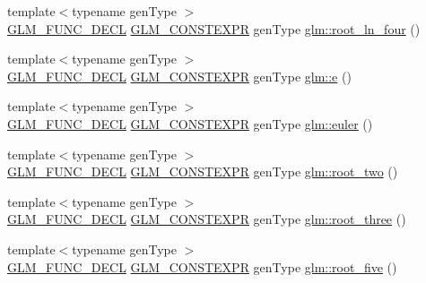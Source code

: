 \begin{DoxyCompactItemize}
\item 
{\footnotesize template$<$typename gen\+Type $>$ }\\\hyperlink{setup_8hpp_ab2d052de21a70539923e9bcbf6e83a51}{G\+L\+M\+\_\+\+F\+U\+N\+C\+\_\+\+D\+E\+CL} \hyperlink{setup_8hpp_a08b807947b47031d3a511f03f89645ad}{G\+L\+M\+\_\+\+C\+O\+N\+S\+T\+E\+X\+PR} gen\+Type \hyperlink{group__gtc__constants_ga4129412e96b33707a77c1a07652e23e2}{glm\+::root\+\_\+ln\+\_\+four} ()
\item 
{\footnotesize template$<$typename gen\+Type $>$ }\\\hyperlink{setup_8hpp_ab2d052de21a70539923e9bcbf6e83a51}{G\+L\+M\+\_\+\+F\+U\+N\+C\+\_\+\+D\+E\+CL} \hyperlink{setup_8hpp_a08b807947b47031d3a511f03f89645ad}{G\+L\+M\+\_\+\+C\+O\+N\+S\+T\+E\+X\+PR} gen\+Type \hyperlink{group__gtc__constants_ga4b7956eb6e2fbedfc7cf2e46e85c5139}{glm\+::e} ()
\item 
{\footnotesize template$<$typename gen\+Type $>$ }\\\hyperlink{setup_8hpp_ab2d052de21a70539923e9bcbf6e83a51}{G\+L\+M\+\_\+\+F\+U\+N\+C\+\_\+\+D\+E\+CL} \hyperlink{setup_8hpp_a08b807947b47031d3a511f03f89645ad}{G\+L\+M\+\_\+\+C\+O\+N\+S\+T\+E\+X\+PR} gen\+Type \hyperlink{group__gtc__constants_gad8fe2e6f90bce9d829e9723b649fbd42}{glm\+::euler} ()
\item 
{\footnotesize template$<$typename gen\+Type $>$ }\\\hyperlink{setup_8hpp_ab2d052de21a70539923e9bcbf6e83a51}{G\+L\+M\+\_\+\+F\+U\+N\+C\+\_\+\+D\+E\+CL} \hyperlink{setup_8hpp_a08b807947b47031d3a511f03f89645ad}{G\+L\+M\+\_\+\+C\+O\+N\+S\+T\+E\+X\+PR} gen\+Type \hyperlink{group__gtc__constants_ga74e607d29020f100c0d0dc46ce2ca950}{glm\+::root\+\_\+two} ()
\item 
{\footnotesize template$<$typename gen\+Type $>$ }\\\hyperlink{setup_8hpp_ab2d052de21a70539923e9bcbf6e83a51}{G\+L\+M\+\_\+\+F\+U\+N\+C\+\_\+\+D\+E\+CL} \hyperlink{setup_8hpp_a08b807947b47031d3a511f03f89645ad}{G\+L\+M\+\_\+\+C\+O\+N\+S\+T\+E\+X\+PR} gen\+Type \hyperlink{group__gtc__constants_ga4f286be4abe88be1eed7d2a9f6cb193e}{glm\+::root\+\_\+three} ()
\item 
{\footnotesize template$<$typename gen\+Type $>$ }\\\hyperlink{setup_8hpp_ab2d052de21a70539923e9bcbf6e83a51}{G\+L\+M\+\_\+\+F\+U\+N\+C\+\_\+\+D\+E\+CL} \hyperlink{setup_8hpp_a08b807947b47031d3a511f03f89645ad}{G\+L\+M\+\_\+\+C\+O\+N\+S\+T\+E\+X\+PR} gen\+Type \hyperlink{group__gtc__constants_gae9ebbded75b53d4faeb1e4ef8b3347a2}{glm\+::root\+\_\+five} ()

\end{DoxyCompactItemize}
